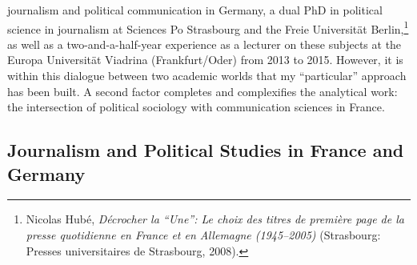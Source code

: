 \documentclass{tufte-handout}
\begin{document}
journalism and political communication in Germany, a dual PhD in
political science in journalism at Sciences Po Strasbourg and the Freie
Universität Berlin,\footnote{Nicolas Hubé, \emph{Décrocher la ``Une'':
  Le choix des titres de première page de la presse quotidienne en
  France et en Allemagne (1945--2005)} (Strasbourg: Presses
  universitaires de Strasbourg, 2008).} as well as a two-and-a-half-year
experience as a lecturer on these subjects at the Europa Universität
Viadrina (Frankfurt/Oder) from 2013 to 2015. However, it is within this
dialogue between two academic worlds that my ``particular'' approach has
been built. A second factor completes and complexifies the analytical
work: the intersection of political sociology with communication
sciences in France.

\hypertarget{journalism-and-political-studies-in-france-and-germany}{%
\subsection{Journalism and Political Studies in
France and
Germany}\label{journalism-and-political-studies-in-france-and-germany}}
\end{document}
